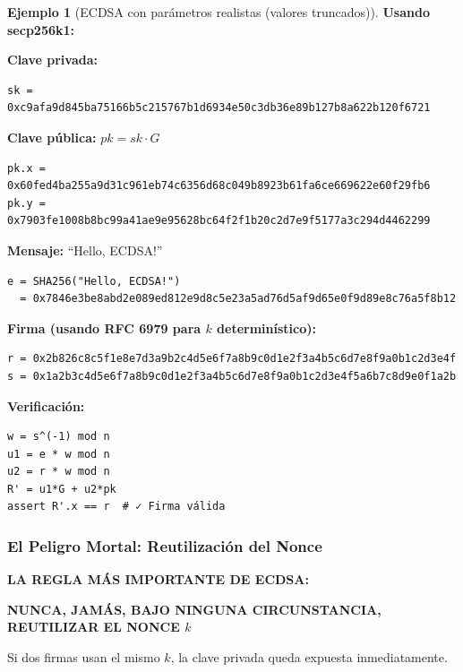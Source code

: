 \documentclass[11pt,a4paper,twoside,openright]{book}
\theoremstyle{definition}
\newtheorem{example}{Ejemplo}[chapter]
\theoremstyle{plain}
\theoremstyle{remark}
\begin{document}
\begin{example}[ECDSA con parámetros realistas (valores truncados)]
\textbf{Usando secp256k1:}

\textbf{Clave privada:}
\begin{verbatim}
sk = 0xc9afa9d845ba75166b5c215767b1d6934e50c3db36e89b127b8a622b120f6721
\end{verbatim}

\textbf{Clave pública:} $pk = sk \cdot G$
\begin{verbatim}
pk.x = 0x60fed4ba255a9d31c961eb74c6356d68c049b8923b61fa6ce669622e60f29fb6
pk.y = 0x7903fe1008b8bc99a41ae9e95628bc64f2f1b20c2d7e9f5177a3c294d4462299
\end{verbatim}

\textbf{Mensaje:} ``Hello, ECDSA!''
\begin{verbatim}
e = SHA256("Hello, ECDSA!") 
  = 0x7846e3be8abd2e089ed812e9d8c5e23a5ad76d5af9d65e0f9d89e8c76a5f8b12
\end{verbatim}

\textbf{Firma (usando RFC 6979 para $k$ determinístico):}
\begin{verbatim}
r = 0x2b826c8c5f1e8e7d3a9b2c4d5e6f7a8b9c0d1e2f3a4b5c6d7e8f9a0b1c2d3e4f
s = 0x1a2b3c4d5e6f7a8b9c0d1e2f3a4b5c6d7e8f9a0b1c2d3e4f5a6b7c8d9e0f1a2b
\end{verbatim}

\textbf{Verificación:}
\begin{verbatim}
w = s^(-1) mod n
u1 = e * w mod n
u2 = r * w mod n
R' = u1*G + u2*pk
assert R'.x == r  # ✓ Firma válida
\end{verbatim}
\end{example}

\subsubsection{El Peligro Mortal: Reutilización del Nonce}

\begin{advertencia}
\textbf{LA REGLA MÁS IMPORTANTE DE ECDSA:}

\begin{center}
\textbf{NUNCA, JAMÁS, BAJO NINGUNA CIRCUNSTANCIA, REUTILIZAR EL NONCE $k$}
\end{center}

Si dos firmas usan el mismo $k$, la clave privada queda expuesta inmediatamente.
\end{advertencia}
\end{document}
